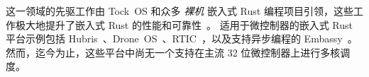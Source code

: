 这一领域的先驱工作由 Tock~OS\cite{levy2015ownership} 和众多 \emph{裸机} 嵌入式 Rust 编程项目引领，这些工作极大地提升了嵌入式 Rust 的性能和可靠性~\cite{embedded-rust-book}。
适用于微控制器的嵌入式 Rust 平台示例包括 Hubris~\cite{hubris}、Drone~OS~\cite{drone-os}、RTIC~\cite{rtic}，以及支持异步编程的 Embassy~\cite{embassy}。%
然而，迄今为止，这些平台中尚无一个支持在主流 32 位微控制器上进行多核调度。
\iffalse
The so-called ownership model in Rust can conflict with common resource-sharing practices used in embedded systems to fit smaller memory budgets, thus requiring new workarounds to maintain memory safety guarantees~\cite{levy2015ownership}. Despite such challenges Rust is attractive for developing less vulnerable embedded software, because of its memory safety features (as well as more convenient abstraction and more modern tooling, compared to C).
\fi









